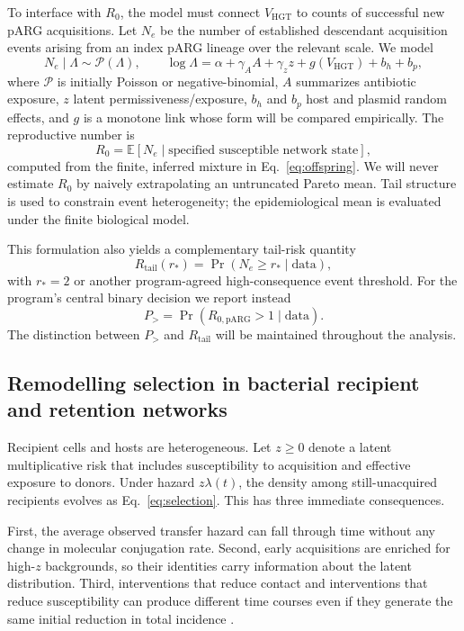 \documentclass[12pt,a4paper]{article}
\newcommand{\RpARG}{R_{0,\mathrm{pARG}}}
\newcommand{\VHGT}{V_{\mathrm{HGT}}}
\newcommand{\Rtail}{R_{\mathrm{tail}}}
\newcommand{\Prob}{\Pr}
\newcommand{\E}{\mathbb{E}}
\begin{document}
To interface with $R_0$, the model must connect $\VHGT$ to counts of successful new pARG acquisitions. Let $N_e$ be the number of established descendant acquisition events arising from an index pARG lineage over the relevant scale. We model
\begin{equation}
N_e\mid \Lambda \sim \mathcal{P}(\Lambda),\qquad
\log \Lambda = \alpha + \gamma_A A + \gamma_z z + g(\VHGT)+b_h+b_p,
\label{eq:offspring}
\end{equation}
where $\mathcal{P}$ is initially Poisson or negative-binomial, $A$ summarizes antibiotic exposure, $z$ latent permissiveness/exposure, $b_h$ and $b_p$ host and plasmid random effects, and $g$ is a monotone link whose form will be compared empirically. The reproductive number is
\begin{equation}
R_0=\E[N_e\mid\text{specified susceptible network state}],
\end{equation}
computed from the finite, inferred mixture in Eq.~\eqref{eq:offspring}. We will never estimate $R_0$ by naively extrapolating an untruncated Pareto mean. Tail structure is used to constrain event heterogeneity; the epidemiological mean is evaluated under the finite biological model.

This formulation also yields a complementary tail-risk quantity
\begin{equation}
\Rtail(r_*) = \Prob(N_e\ge r_*\mid\mathrm{data}),
\end{equation}
with $r_*=2$ or another program-agreed high-consequence event threshold. For the program's central binary decision we report instead
\begin{equation}
P_> = \Prob(\RpARG>1\mid\mathrm{data}).
\end{equation}
The distinction between $P_>$ and $\Rtail$ will be maintained throughout the analysis.

\subsection{Remodelling selection in bacterial recipient and retention networks}

Recipient cells and hosts are heterogeneous. Let $z\ge0$ denote a latent multiplicative risk that includes susceptibility to acquisition and effective exposure to donors. Under hazard $z\lambda(t)$, the density among still-unacquired recipients evolves as Eq.~\eqref{eq:selection}. This has three immediate consequences.

First, the average observed transfer hazard can fall through time without any change in molecular conjugation rate. Second, early acquisitions are enriched for high-$z$ backgrounds, so their identities carry information about the latent distribution. Third, interventions that reduce contact and interventions that reduce susceptibility can produce different time courses even if they generate the same initial reduction in total incidence \citep{elie2022,gomes2024}.
\end{document}
